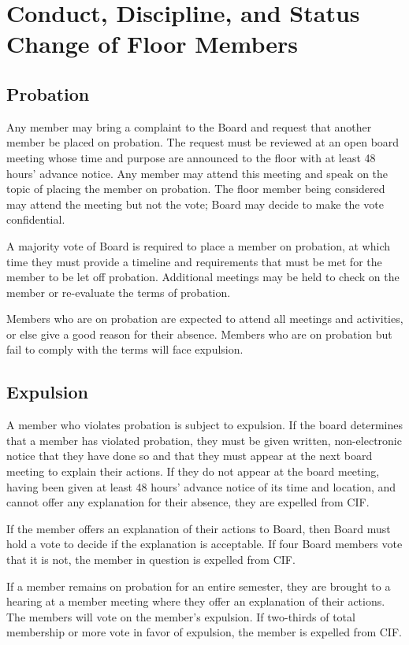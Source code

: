 \documentclass[12pt]{amsart}
\begin{document}
\section {Conduct, Discipline, and Status Change of Floor Members}
	\subsection {Probation}
Any member may bring a complaint to the Board and request that another member be placed on probation. The request must be reviewed at an open board meeting whose time and purpose are announced to the floor with at least 48 hours' advance notice. Any member may attend this meeting and speak on the topic of placing the member on probation. The floor member being considered may attend the meeting but not the vote; Board may decide to make the vote confidential.

A majority vote of Board is required to place a member on probation, at which time they must provide a timeline and requirements that must be met for the member to be let off probation. Additional meetings may be held to check on the member or re-evaluate the terms of probation.

Members who are on probation are expected to attend all meetings and activities, or else give a good reason for their absence. Members who are on probation but fail to comply with the terms will face expulsion.
	\subsection {Expulsion}
A member who violates probation is subject to expulsion. If the board determines that a member has violated probation, they must be given written, non-electronic notice that they have done so and that they must appear at the next board meeting to explain their actions. If they do not appear at the board meeting, having been given at least 48 hours' advance notice of its time and location, and cannot offer any explanation for their absence, they are expelled from CIF.

If the member offers an explanation of their actions to Board, then Board must hold a vote to decide if the explanation is acceptable. If four Board members vote that it is not, the member in question is expelled from CIF.

If a member remains on probation for an entire semester, they are brought to a hearing at a member meeting where they offer an explanation of their actions. The members will vote on the member's expulsion. If two-thirds of total membership or more vote in favor of expulsion, the member is expelled from CIF.
\end{document}
